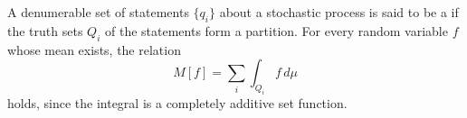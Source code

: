 A denumerable set of statements $\{q_i\}$ about a stochastic process is said to be a  if the truth sets $Q_i$ of the statements form a partition. For every random variable $f$ whose mean exists, the relation
$$M[f] = \sum_i \int_{Q_i} f \, d\mu$$
holds, since the integral is a completely additive set function.
